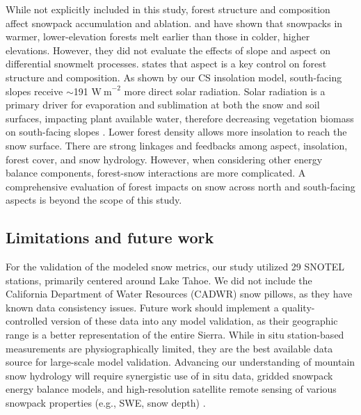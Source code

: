 While not explicitly included in this study, forest structure and composition affect snowpack accumulation and ablation. \cite{rothForestImpactsSnow2017} and \cite{lundquistLowerForestDensity2013} have shown that snowpacks in warmer, lower-elevation forests melt earlier than those in colder, higher elevations. However, they did not evaluate the effects of slope and aspect on differential snowmelt processes. \cite{pelletierWhichWayYou2018a} states that aspect is a key control on forest structure and composition. As shown by our CS insolation model, south-facing slopes receive $\sim$191 $\mathrm{W~m}^{-2}$ more direct solar radiation. Solar radiation is a primary driver for evaporation and sublimation at both the snow and soil surfaces, impacting plant available water, therefore decreasing vegetation biomass on south-facing slopes \citep{zapata-riosInfluenceTerrainAspect2016}. Lower forest density allows more insolation to reach the snow surface. There are strong linkages and feedbacks among aspect, insolation, forest cover, and snow hydrology. However, when considering other energy balance components, forest-snow interactions are more complicated.  A comprehensive evaluation of forest impacts on snow across north and south-facing aspects is beyond the scope of this study.

\hypertarget{ch2-discussion-1}{\subsection{Limitations and future work}\label{ch2-discussion-1}}

For the validation of the modeled snow metrics, our study utilized 29 SNOTEL stations, primarily centered around Lake Tahoe. We did not include the California Department of Water Resources (CADWR) snow pillows, as they have known data consistency issues. Future work should implement a quality-controlled version of these data into any model validation, as their geographic range is a better representation of the entire Sierra. While in situ station-based measurements are physiographically limited, they are the best available data source for large-scale model validation. Advancing our understanding of mountain snow hydrology will require synergistic use of in situ data, gridded snowpack energy balance models, and high-resolution satellite remote sensing of various snowpack properties (e.g., SWE, snow depth) \citep{flemingSNOTELSoilClimate2023}.


